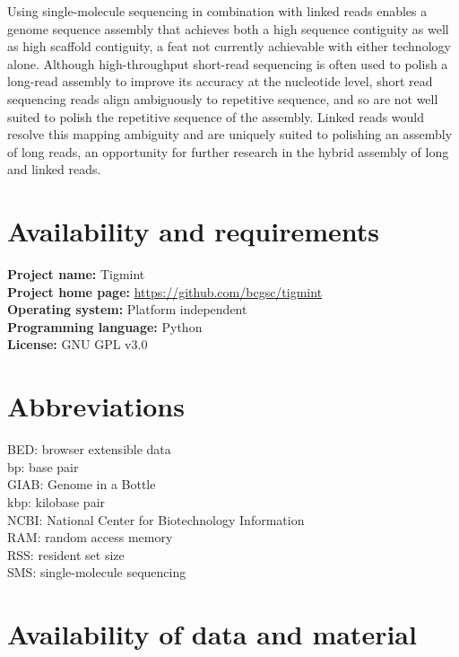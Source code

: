 \documentclass{bmcart}
\begin{document}
Using single-molecule sequencing in combination with linked reads enables a genome sequence assembly that achieves both a high sequence contiguity as well as high scaffold contiguity, a feat not currently achievable with either technology alone. Although high-throughput short-read sequencing is often used to polish a long-read assembly to improve its accuracy at the nucleotide level, short read sequencing reads align ambiguously to repetitive sequence, and so are not well suited to polish the repetitive sequence of the assembly. Linked reads would resolve this mapping ambiguity and are uniquely suited to polishing an assembly of long reads, an opportunity for further research in the hybrid assembly of long and linked reads.

\begin{backmatter}

\hypertarget{availability-and-requirements}{%
\section*{Availability and requirements}\label{availability-and-requirements}}

\textbf{Project name:} Tigmint\\
\textbf{Project home page:} \url{https://github.com/bcgsc/tigmint}\\
\textbf{Operating system:} Platform independent\\
\textbf{Programming language:} Python\\
\textbf{License:} GNU GPL v3.0

\hypertarget{abbreviations}{%
\section*{Abbreviations}\label{abbreviations}}

BED: browser extensible data
\\ bp: base pair
\\ GIAB: Genome in a Bottle
\\ kbp: kilobase pair
\\ NCBI: National Center for Biotechnology Information
\\ RAM: random access memory
\\ RSS: resident set size
\\ SMS: single-molecule sequencing

\hypertarget{availability-of-data-and-material}{%
\section*{Availability of data and material}\label{availability-of-data-and-material}}


\end{backmatter}
\end{document}
